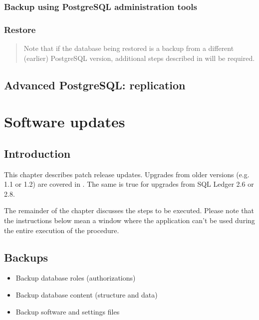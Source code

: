 \subsection{Backup using PostgreSQL administration tools}
\label{subsec-contingency-backup-psql}

\subsection{Restore}
\label{subsec-contingency-restore}

\begin{quotation}
Note that if the database being restored is a backup from a different (earlier) PostgreSQL version,
additional steps described in  will be required.
\end{quotation}




\section{Advanced PostgreSQL: replication}
\label{sec-contingency-replication}


\chapter{Software updates}
\label{cha-software-updates}

\section{Introduction}
\label{sec-updates-introduction}

This chapter describes patch release updates. Upgrades from older versions (e.g. 1.1 or 1.2)
are covered in . The same is true for upgrades from SQL Ledger 2.6 or 2.8.

The remainder of the chapter discusses the steps to be executed. Please note that the instructions
below mean a window where the application can't be used during the entire execution of the procedure.

\section{Backups}
\label{sec-updates-backups}

\begin{itemize}
\item Backup database roles (authorizations)
\item Backup database content (structure and data)
\item Backup software and settings files
\end{itemize}




